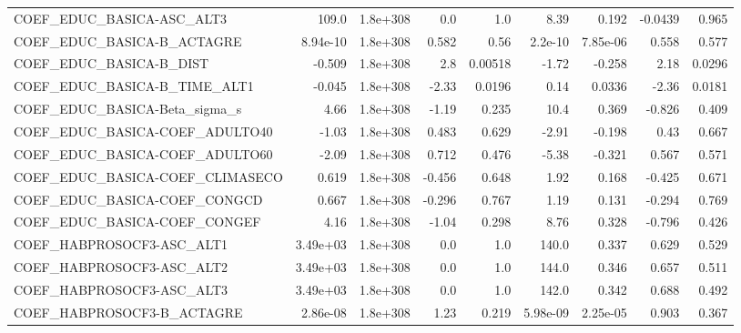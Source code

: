 \begin{tabular}{lrrrrrrrr}
COEF\_EDUC\_BASICA-ASC\_ALT3         &       109.0 &     1.8e+308 &     0.0 &      1.0 &       8.39 &       0.192 &      -0.0439 &         0.965 \\
COEF\_EDUC\_BASICA-B\_ACTAGRE        &    8.94e-10 &     1.8e+308 &   0.582 &     0.56 &    2.2e-10 &    7.85e-06 &        0.558 &         0.577 \\
COEF\_EDUC\_BASICA-B\_DIST           &      -0.509 &     1.8e+308 &     2.8 &  0.00518 &      -1.72 &      -0.258 &         2.18 &        0.0296 \\
COEF\_EDUC\_BASICA-B\_TIME\_ALT1      &      -0.045 &     1.8e+308 &   -2.33 &   0.0196 &       0.14 &      0.0336 &        -2.36 &        0.0181 \\
COEF\_EDUC\_BASICA-Beta\_sigma\_s     &        4.66 &     1.8e+308 &   -1.19 &    0.235 &       10.4 &       0.369 &       -0.826 &         0.409 \\
COEF\_EDUC\_BASICA-COEF\_ADULTO40    &       -1.03 &     1.8e+308 &   0.483 &    0.629 &      -2.91 &      -0.198 &         0.43 &         0.667 \\
COEF\_EDUC\_BASICA-COEF\_ADULTO60    &       -2.09 &     1.8e+308 &   0.712 &    0.476 &      -5.38 &      -0.321 &        0.567 &         0.571 \\
COEF\_EDUC\_BASICA-COEF\_CLIMASECO   &       0.619 &     1.8e+308 &  -0.456 &    0.648 &       1.92 &       0.168 &       -0.425 &         0.671 \\
COEF\_EDUC\_BASICA-COEF\_CONGCD      &       0.667 &     1.8e+308 &  -0.296 &    0.767 &       1.19 &       0.131 &       -0.294 &         0.769 \\
COEF\_EDUC\_BASICA-COEF\_CONGEF      &        4.16 &     1.8e+308 &   -1.04 &    0.298 &       8.76 &       0.328 &       -0.796 &         0.426 \\
COEF\_HABPROSOCF3-ASC\_ALT1         &    3.49e+03 &     1.8e+308 &     0.0 &      1.0 &      140.0 &       0.337 &        0.629 &         0.529 \\
COEF\_HABPROSOCF3-ASC\_ALT2         &    3.49e+03 &     1.8e+308 &     0.0 &      1.0 &      144.0 &       0.346 &        0.657 &         0.511 \\
COEF\_HABPROSOCF3-ASC\_ALT3         &    3.49e+03 &     1.8e+308 &     0.0 &      1.0 &      142.0 &       0.342 &        0.688 &         0.492 \\
COEF\_HABPROSOCF3-B\_ACTAGRE        &    2.86e-08 &     1.8e+308 &    1.23 &    0.219 &   5.98e-09 &    2.25e-05 &        0.903 &         0.367 \\

\end{tabular}
